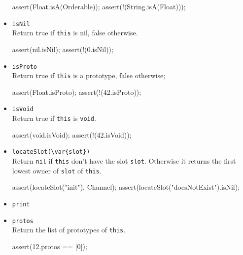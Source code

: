 \begin{itemize}
\begin{urbiscript}[firstnumber=last]
assert(Float.isA(Orderable));
assert(!(String.isA(Float)));
\end{urbiscript}

\item \lstinline|isNil|\\
  Return true if \lstinline|this| is nil, false otherwise.

\begin{urbiscript}[firstnumber=last]
assert(nil.isNil);
assert(!(0.isNil));
\end{urbiscript}

\item \lstinline|isProto|\\
  Return true if \lstinline|this| is a prototype, false otherwise;

\begin{urbiscript}[firstnumber=last]
assert(Float.isProto);
assert(!(42.isProto));
\end{urbiscript}

\item \lstinline|isVoid|\\
  Return true if \lstinline|this| is \lstinline|void|.

\begin{urbiscript}[firstnumber=last]
assert(void.isVoid);
assert(!(42.isVoid));
\end{urbiscript}

\item \lstinline|locateSlot(\var{slot})|\\
  Return \lstinline|nil| if \lstinline|this| don't have the slot
  \lstinline|slot|. Otherwise it returns the first lowest owner of
  \lstinline|slot| of \lstinline|this|.

\begin{urbiscript}[firstnumber=last]
assert(locateSlot("init"), Channel);
assert(locateSlot("doesNotExist").isNil);
\end{urbiscript}

\item \lstinline|print|\\

\item \lstinline|protos|\\
  Return the list of prototypes of \lstinline|this|.
\begin{urbiscript}[firstnumber=last]
assert(12.protos == [0]);
\end{urbiscript}


\end{itemize}
